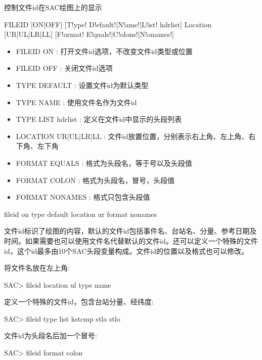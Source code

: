 \label{cmd:fileid}

控制文件id在SAC绘图上的显示

\begin{SACSTX}
FILEID [ON|OFF] [T!ype! D!efault!|N!ame!|L!ist! hdrlist] Location [UR|UL|LR|LL] 
    [F!ormat! E!quals!|C!olons!|N!onames!]
\end{SACSTX}

\begin{itemize}
\item FILEID ON : 打开文件id选项，不改变文件id类型或位置 
\item FILEID OFF : 关闭文件id选项 
\item TYPE DEFAULT : 设置文件id为默认类型 
\item TYPE NAME : 使用文件名作为文件id 
\item TYPE LIST hdrlist : 定义在文件id中显示的头段列表 
\item LOCATION UR|UL|LR|LL : 文件id放置位置，分别表示右上角、左上角、右下角、左下角
\item FORMAT EQUALS : 格式为头段名，等于号以及头段值 
\item FORMAT COLON : 格式为头段名，冒号，头段值 
\item FORMAT NONAMES : 格式只包含头段值 
\end{itemize}

\begin{SACDFT}
fileid on type default location ur format nonames
\end{SACDFT}

文件id标识了绘图的内容，默认的文件id包括事件名、台站名、分量、参考日期及时间。如果需要也可以使用文件名代替默认的文件id。还可以定义一个特殊的文件id，这个id最多由10个SAC头段变量构成。文件id的位置以及格式也可以修改。

将文件名放在左上角:
\begin{SACCode}
SAC> fileid location ul type name
\end{SACCode}

定义一个特殊的文件id，包含台站分量、经纬度:
\begin{SACCode}
SAC> fileid type list kstcmp stla stlo
\end{SACCode}

文件id为头段名后加一个冒号:
\begin{SACCode}
SAC> fileid format colon
\end{SACCode}
